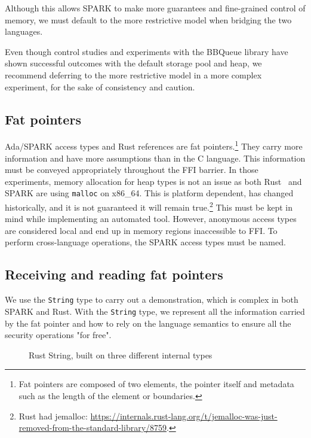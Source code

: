 \documentclass[nomenclature, english, bibtex]{kththesis}
\begin{document}
Although this allows SPARK to make more guarantees and fine-grained control of memory, we must default to the more restrictive model when bridging the two languages. 

Even though control studies and experiments with the BBQueue library have shown successful outcomes with the default storage pool and heap, we recommend deferring to the more restrictive model in a more complex experiment, for the sake of consistency and caution.

\subsection{Fat pointers}

Ada/SPARK access types and Rust references are fat pointers.\footnote{Fat pointers are composed of two elements, the pointer itself and metadata such as the length of the element or boundaries.} They carry more information and have more assumptions than in the C language. This information must be conveyed appropriately throughout the FFI barrier. In those experiments, memory allocation for heap types is not an issue as both Rust~\cite{santos_investigating_2022} and SPARK are using \texttt{malloc} on x86\_64. This is platform dependent, has changed historically, and it is not guaranteed it will remain true.\footnote{Rust had jemalloc: \url{https://internals.rust-lang.org/t/jemalloc-was-just-removed-from-the-standard-library/8759}.} 
This must be kept in mind while implementing an automated tool. However, anonymous access types are considered local and end up in memory regions inaccessible to \gls{FFI}. To perform cross-language operations, the SPARK access types must be named.

\subsection{Receiving and reading fat pointers}
\label{sec:receiving-fat-pointers}
We use the \texttt{String} type to carry out a demonstration, which is complex in both SPARK and Rust. With the \texttt{String} type, we represent all the information carried by the fat pointer and how to rely on the language semantics to ensure all the security operations "for free".

\begin{figure}[ht!]
    \centering
  \caption{Rust String, built on three different internal types}
  \label{fig:ruststring}
\end{figure}
\FloatBarrier
\end{document}
